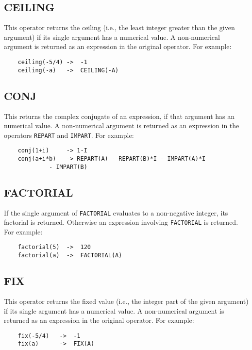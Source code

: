 \subsection{CEILING}
\hypertarget{operator:CEILING}{}
This operator returns the ceiling (i.e., the least integer greater than
the given argument) if its single argument has a numerical value.  A
non-numerical argument is returned as an expression in the original
operator.  For example:

\begin{verbatim}
	ceiling(-5/4) ->  -1
	ceiling(-a)   ->  CEILING(-A)
\end{verbatim}

\subsection{CONJ}
\hypertarget{operator:CONJ}{}
This returns the complex conjugate
of an expression, if that argument has an numerical value.  A
non-numerical argument is returned as an expression in the operators
{\tt REPART} and {\tt IMPART}. For example:
\begin{verbatim}
	conj(1+i)     -> 1-I
	conj(a+i*b)   -> REPART(A) - REPART(B)*I - IMPART(A)*I
			 - IMPART(B)
\end{verbatim}

\subsection{FACTORIAL}
\hypertarget{operator:FACTORIAL}{}

If the single argument of {\tt FACTORIAL} evaluates to a non-negative
integer, its factorial is returned.  Otherwise an expression involving
{\tt FACTORIAL} is returned. For example:
\begin{verbatim}
	factorial(5)  ->  120
	factorial(a)  ->  FACTORIAL(A)
\end{verbatim}

\subsection{FIX}
\hypertarget{operator:FIX}{}
This operator returns the fixed value (i.e., the integer part of
the given argument) if its single argument has a numerical value.  A
non-numerical argument is returned as an expression in the original
operator.  For example:

\begin{verbatim}
	fix(-5/4)   ->  -1
	fix(a)      ->  FIX(A)
\end{verbatim}

